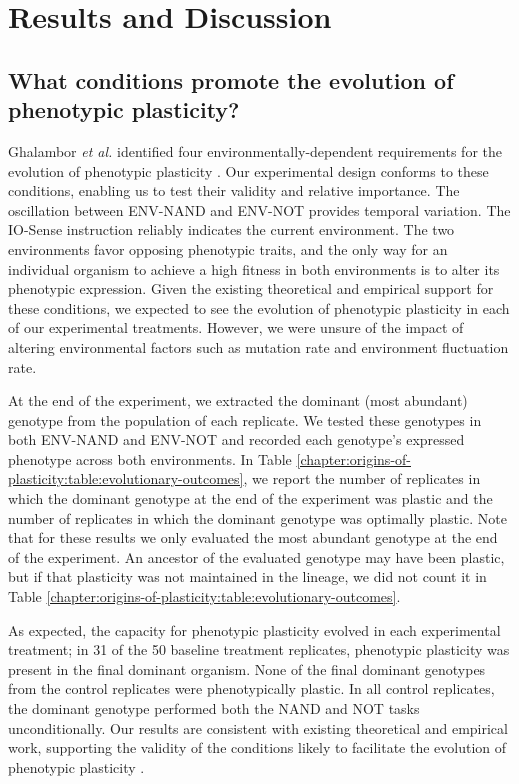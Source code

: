 \section{Results and Discussion}

\subsection{What conditions promote the evolution of phenotypic plasticity?}

Ghalambor \textit{et al.} identified four environmentally-dependent requirements for the evolution of phenotypic plasticity
\citep{ghalambor_behavior_2010}. 
Our experimental design conforms to these conditions, enabling us to test their validity and relative importance. 
The oscillation between ENV-NAND and ENV-NOT provides temporal variation. 
The IO-Sense instruction reliably indicates the current environment. 
The two environments favor opposing phenotypic traits, and the only way for an individual organism to achieve a high fitness in both environments is to alter its phenotypic expression. 
Given the existing theoretical and empirical support for these conditions, we expected to see the evolution of phenotypic plasticity in each of our experimental treatments. 
However, we were unsure of the impact of altering environmental factors such as mutation rate and environment fluctuation rate. 

At the end of the experiment, we extracted the dominant (most abundant) genotype from the population of each replicate.
We tested these genotypes in both ENV-NAND and ENV-NOT and recorded each genotype's expressed phenotype across both environments. 
In Table \ref{chapter:origins-of-plasticity:table:evolutionary-outcomes}, we report the number of replicates in which the dominant genotype at the end of the experiment was plastic and the number of replicates in which the dominant genotype was optimally plastic. 
Note that for these results we only evaluated the most abundant genotype at the end of the experiment. 
An ancestor of the evaluated genotype may have been plastic, but if that plasticity was not maintained in the lineage, we did not count it in Table \ref{chapter:origins-of-plasticity:table:evolutionary-outcomes}. 

As expected, the capacity for phenotypic plasticity evolved in each experimental treatment; in 31 of the 50 baseline treatment replicates, phenotypic plasticity was present in the final dominant organism. 
None of the final dominant genotypes from the control replicates were phenotypically plastic. 
In all control replicates, the dominant genotype performed both the NAND and NOT tasks unconditionally. 
Our results are consistent with existing theoretical and empirical work, supporting the validity of the conditions likely to facilitate the evolution of phenotypic plasticity \citep{clune_investigating_2007,ghalambor_behavior_2010,hallsson_selection_2012,nolfi_phenotypic_1994}. 

